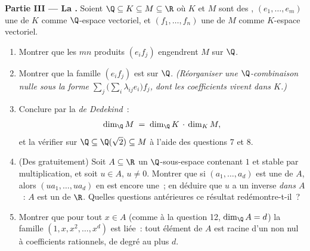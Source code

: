 \begin{problem}
\medskip
\noindent\textbf{Partie III --- La .} Soient $\Q
\subseteq K \subseteq M \subseteq \R$ où $K$ et $M$ sont des
, $(e_1, \dots, e_m)$ une  de $K$ comme $\Q$-espace
vectoriel, et $(f_1, \dots, f_n)$ une  de $M$ comme $K$-espace
vectoriel.
\begin{enumerate}[resume]
  \item Montrer que les $mn$ produits $(e_i f_j)$ engendrent $M$ sur
        $\Q$.
  \item Montrer que la famille $(e_i f_j)$ est  sur $\Q$.
        \emph{(Réorganiser une $\Q$-combinaison nulle sous la forme
        $\sum_j \bigl(\sum_i \lambda_{ij} e_i\bigr) f_j$, dont les
        coefficients  vivent dans $K$.)}
  \item Conclure par la \emph{ de Dedekind}~:
        \[
        \dim_\Q M \;=\; \dim_\Q K \,\cdot\, \dim_K M ,
        \]
        et la vérifier sur $\Q \subseteq \Q(\sqrt2) \subseteq M$
        à l'aide des questions 7 et 8.
  \item (Des  gratuitement) Soit $A \subseteq \R$ un
        $\Q$-sous-espace  contenant $1$ et
        stable par multiplication, et soit $u \in A$, $u \neq
        0$. Montrer que si $(a_1, \dots, a_d)$ est une  de $A$,
        alors $(u a_1, \dots, u a_d)$ en est encore une~; en déduire
        que $u$ a un inverse \emph{dans $A$}~: $A$ est un 
        de $\R$. Quelles questions antérieures ce résultat
        redémontre-t-il~?
  \item Montrer que pour tout $x \in A$ (comme à la question 12,
        $\dim_\Q A = d$) la famille $(1, x, x^2, \dots, x^{d})$ est
        liée~: tout élément de $A$ est racine d'un  non nul à
        coefficients rationnels, de degré au plus $d$.
\end{enumerate}


\end{problem}
